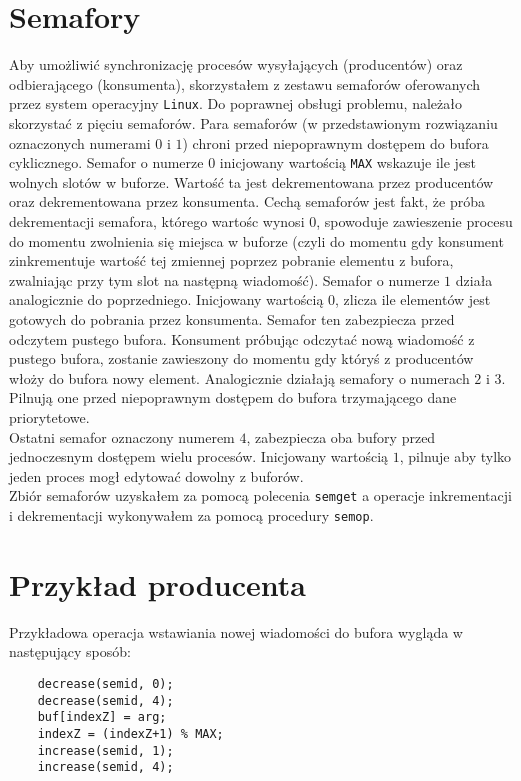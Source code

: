 \documentclass{mwrep}
\begin{document}
\section{Semafory}
Aby umożliwić synchronizację procesów wysyłających (producentów) oraz odbierającego (konsumenta), skorzystałem
z zestawu semaforów oferowanych przez system operacyjny \texttt{Linux}. Do poprawnej obsługi problemu, należało
skorzystać z pięciu semaforów. Para semaforów (w przedstawionym rozwiązaniu oznaczonych numerami $0$ i $1$) chroni przed
niepoprawnym dostępem do bufora cyklicznego. Semafor o numerze $0$ inicjowany wartością \texttt{MAX} wskazuje ile jest wolnych
slotów w buforze. Wartość ta jest dekrementowana przez producentów oraz dekrementowana przez konsumenta. Cechą semaforów jest fakt,
że próba dekrementacji semafora, którego wartośc wynosi $0$, spowoduje zawieszenie procesu do momentu zwolnienia się miejsca w buforze (czyli
do momentu gdy konsument zinkrementuje wartość tej zmiennej poprzez pobranie elementu z bufora, zwalniając przy tym slot na następną wiadomość).
Semafor o numerze $1$ działa analogicznie do poprzedniego. Inicjowany wartością $0$, zlicza ile elementów jest gotowych do pobrania przez
konsumenta. Semafor ten zabezpiecza przed odczytem pustego bufora. Konsument próbując odczytać nową wiadomość z pustego bufora,
zostanie zawieszony do momentu gdy któryś z producentów włoży do bufora nowy element. Analogicznie działają semafory o numerach
$2$ i $3$. Pilnują one przed niepoprawnym dostępem do bufora trzymającego dane priorytetowe. \\

\indent Ostatni semafor oznaczony numerem $4$, zabezpiecza oba bufory przed jednoczesnym dostępem wielu procesów.
Inicjowany wartością $1$, pilnuje aby tylko jeden proces mogł edytować dowolny z buforów. \\

\indent Zbiór semaforów uzyskałem za pomocą polecenia \texttt{semget} a operacje inkrementacji i dekrementacji wykonywałem
za pomocą procedury \texttt{semop}.


\section{Przykład producenta}
\label{producent}
\indent Przykładowa operacja wstawiania nowej wiadomości do bufora wygląda w następujący sposób:

\begin{verbatim}
    decrease(semid, 0);
    decrease(semid, 4);
    buf[indexZ] = arg;
    indexZ = (indexZ+1) % MAX;
    increase(semid, 1);
    increase(semid, 4);
\end{verbatim}
\end{document}
